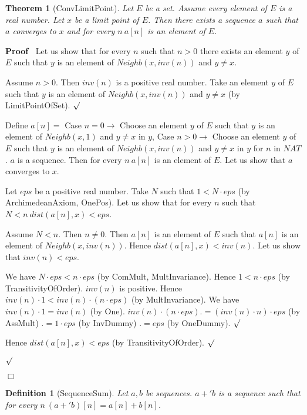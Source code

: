 \documentclass{article}
\newenvironment{forthel}{\begin{leftbar}}{\end{leftbar}}
\newenvironment{proof}{\noindent\textbf{Proof\ }}{\hspace*{\fill}$\Box$\medskip}
\newenvironment{subproof}{\begin{list}{}{}
		\item[\text{Proof}]}{\hfill $\surd$ \end{list}}
\newtheorem{theorem}{Theorem}
\newtheorem{definition}{Definition}
\begin{document}
\begin{forthel}
	\begin{theorem}[ConvLimitPoint]
	Let $E$ be a set. Assume every element of $E$ is a real number. Let $x$ be a limit point of $E$.
	Then there exists a sequence $a$ such that $a$ converges to $x$ and for every $n \ a[n]$ is an element of $E$.
	\end{theorem}
	\begin{proof}
	Let us show that for every $n$ such that $n > 0$ there exists an element $y$ of $E$ such that
	$y$ is an element of $Neighb(x,inv(n))$ and $y \neq x$.
	\begin{subproof}
	Assume $n > 0$.
	Then $inv(n)$ is a positive real number.
	Take an element $y$ of $E$ such that $y$ is an element of $Neighb(x,inv(n))$
	and $y \neq x$ (by LimitPointOfSet).
	\end{subproof}
	Define $a[n] =$ Case $n = 0 \rightarrow$ Choose an element $y$ of $E$ such that $y$ is an element of
	$Neighb(x,1)$ and $y \neq x$ in $y$,
	Case $n > 0 \rightarrow$ Choose an element $y$ of $E$ such that $y$ is an element of
	$Neighb(x,inv(n))$ and $y \neq x$ in $y$
	for $n$ in $NAT$.
	$a$ is a sequence.	
	Then for every $n \ a[n]$ is an element of $E$.
	Let us show that $a$ converges to $x$.
	\begin{subproof}
	Let $eps$ be a positive real number.
	Take $N$ such that $1 < N \cdot eps$ (by ArchimedeanAxiom, OnePos).
	Let us show that for every $n$ such that $N < n \ dist(a[n],x) < eps$.
	\begin{subproof}
	Assume $N < n$. Then $n \neq 0$.
	Then $a[n]$ is an element of $E$ such that $a[n]$ is an element of $Neighb(x,inv(n))$.
	Hence $dist(a[n],x) < inv(n)$.
	Let us show that $inv(n) < eps$.
	\begin{subproof}
	We have $N \cdot eps < n \cdot eps$ (by ComMult, MultInvariance).
	Hence $1 < n \cdot eps$ (by TransitivityOfOrder).
	$inv(n)$ is positive.
	Hence $inv(n) \cdot 1 < inv(n) \cdot (n \cdot eps)$ (by MultInvariance).
	We have $inv(n) \cdot 1 = inv(n)$ (by One).
	$inv(n) \cdot (n \cdot eps) .= (inv(n) \cdot n) \cdot eps$ (by AssMult)
	$.= 1 \cdot eps$ (by InvDummy)
	$.= eps$ (by OneDummy).
	\end{subproof}
	Hence $dist(a[n],x) < eps$ (by TransitivityOfOrder).
	\end{subproof}
	\end{subproof}
	\end{proof}
	
	\begin{definition}[SequenceSum]
	Let $a,b$ be sequences. $a +' b$ is a sequence such that for every $n \ (a +' b)[n] = a[n] + b[n]$.
	\end{definition}
	

\end{forthel}
\end{document}
